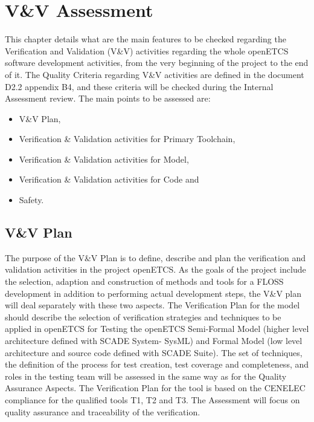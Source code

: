 \documentclass[openetcs]{template/openetcs_article}
\begin{document}
\section{V\&V Assessment}
This chapter details what are the main features to be checked regarding the Verification and Validation (V\&V) activities regarding the whole openETCS software
development activities, from the very beginning of the project to the end of it.
The Quality Criteria regarding V\&V activities are defined in the document D2.2 appendix B4, and these criteria will be checked during the Internal Assessment
review. The main points to be assessed are:
\begin{itemize}
\item V\&V Plan,
\item Verification \& Validation activities for Primary Toolchain,
\item Verification \& Validation activities for Model,
\item Verification \& Validation activities for Code and
\item Safety.
\end{itemize}

\subsection{V\&V Plan}
The purpose of the V\&V Plan is to define, describe and plan the verification and validation activities in the project openETCS. As the goals of the project
include the selection, adaption and construction of methods and tools for a FLOSS development in addition to performing actual development steps, the V\&V plan
will deal separately with these two aspects.
The Verification Plan for the model should describe the selection of verification strategies and techniques to be applied in openETCS for Testing the openETCS Semi-Formal Model (higher level architecture defined with SCADE System- SysML) and Formal Model (low level architecture and source code defined with SCADE Suite). The set of techniques, the definition of the process for test creation, test coverage and completeness, and roles in
the testing team will be assessed in the same way as for the Quality Assurance Aspects.
The Verification Plan for the tool is based on the CENELEC compliance for the qualified tools T1, T2 and T3. The Assessment will focus on quality assurance and
traceability of the verification.
\end{document}
